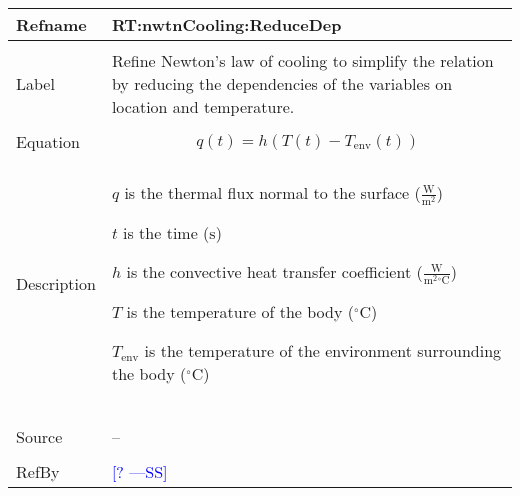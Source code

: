 \documentclass[12pt]{article}
\newcommand{\authornote}[3]{\textcolor{#1}{[#3 ---#2]}}
\newcommand{\authornote}[3]{}
\newcommand{\wss}[1]{\authornote{blue}{SS}{#1}}
\begin{document}
\vspace{\baselineskip}
\noindent
\begin{minipage}{\textwidth}
\begin{tabular}{>{\raggedright}p{}>{\raggedright\arraybackslash}p{}}
\toprule \textbf{Refname} & \textbf{RT:nwtnCooling:ReduceDep}
\label{RT:nwtnCooling:ReduceDep}
\\ \midrule \\
Label & Refine Newton's law of cooling to simplify the relation by reducing the
dependencies of the variables on location and temperature. 
\\ \midrule \\
Equation & \begin{displaymath} 
        q\left(t\right) = h(T(t) - T_{\text{env}}(t))
        \end{displaymath}
\\ \midrule \\
Description & \begin{symbDescription}
              \item{$q$ is the thermal flux normal to the surface ($\frac{\text{W}}{\text{m}^{2}}$)}
              \item{$t$ is the time (${\text{s}}$)}
              \item{$h$ is the convective heat transfer coefficient ($\frac{\text{W}}{\text{m}^{2}{}^{\circ}\text{C}}$)}
              \item{$T$ is the temperature of the body (${{}^{\circ}\text{C}}$)}
              \item{$T_{\text{env}}$ is the temperature of the environment surrounding the body (${{}^{\circ}\text{C}}$)}
              \end{symbDescription}
\\ \midrule \\

\\ \midrule \\
Source & --
         
\\ \midrule \\
RefBy & \wss{?}
        
\\ \bottomrule
\end{tabular}
\end{minipage}

\end{document}
